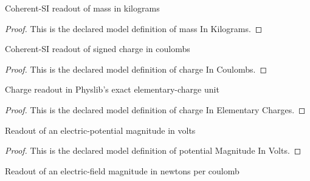 \begin{definition}
  \label{def:physics:phyx-mini-0993:phyxminiproblems-problemphyxmini0993-massinkilograms}
  Coherent-SI readout of mass in kilograms
\end{definition}
\begin{proof}
  This is the declared model definition of mass In Kilograms.
\end{proof}
\begin{definition}
  \label{def:physics:phyx-mini-0993:phyxminiproblems-problemphyxmini0993-chargeincoulombs}
  Coherent-SI readout of signed charge in coulombs
\end{definition}
\begin{proof}
  This is the declared model definition of charge In Coulombs.
\end{proof}
\begin{definition}
  \label{def:physics:phyx-mini-0993:phyxminiproblems-problemphyxmini0993-chargeinelementarycharges}
  Charge readout in Physlib's exact elementary-charge unit
\end{definition}
\begin{proof}
  This is the declared model definition of charge In Elementary Charges.
\end{proof}
\begin{definition}
  \label{def:physics:phyx-mini-0993:phyxminiproblems-problemphyxmini0993-potentialmagnitudeinvolts}
  Readout of an electric-potential magnitude in volts
\end{definition}
\begin{proof}
  This is the declared model definition of potential Magnitude In Volts.
\end{proof}
\begin{definition}
  \label{def:physics:phyx-mini-0993:phyxminiproblems-problemphyxmini0993-fieldmagnitudeinnewtonspercoulomb}
  Readout of an electric-field magnitude in newtons per coulomb
\end{definition}
